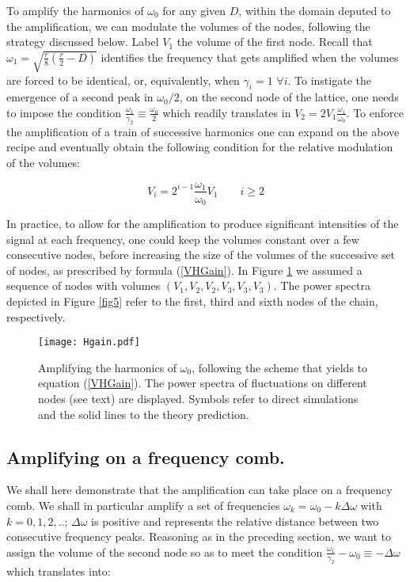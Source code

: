 \documentclass[showpacs,prl,superscriptaddress,nofootinbib, twocolumn]{revtex4}
\begin{document}
To amplify the harmonics of $\omega_0$ for any given $D$, within the domain deputed to the amplification, we can modulate the volumes of the nodes, following the strategy discussed below. Label $V_1$ the volume of the first node. Recall that $\omega_1=\sqrt{\frac{r}{8} \left(\frac{r}{2}-D\right)}$ identifies the frequency that gets amplified when the volumes are forced to be identical, or, equivalently, when $\gamma_i=1$ $\forall i$. To instigate the emergence of a second peak in $\omega_0/2$, on the second node of the lattice,  one needs to impose the condition $\frac{\omega_1}{\gamma_2} \equiv \frac{\omega_0}{2}$ which readily translates in $V_2=2V_1 \frac{\omega_1}{\omega_0}$. To enforce the amplification of a train of successive harmonics one can expand on the above recipe and eventually obtain the following condition for the relative modulation of the volumes:

\begin{equation}
\label{VHGain}
V_i = 2^{i-1} \frac{\omega_1}{\omega_0}V_1 \qquad i \ge 2
\end{equation}

In practice, to allow for the amplification to produce significant intensities of the signal at each frequency, one could keep the volumes constant over a few consecutive nodes, before increasing the size of the volumes of the successive set of nodes, as prescribed by formula (\ref{VHGain}). In Figure  \ref{fig4} we assumed a sequence of nodes with volumes $(V_1, V_2, V_2, V_3, V_3, V_3)$. The power spectra depicted in Figure  \ref{fig5}  refer to the first, third and sixth nodes of the chain, respectively.
   

\begin{figure}
 \centering
   {\texttt{[image: Hgain.pdf]}}
   \caption{Amplifying the harmonics of $\omega_0$, following the scheme that yields to equation (\ref{VHGain}). The power spectra of fluctuations on different nodes (see text) are displayed. Symbols refer to direct simulations and the solid lines to the theory prediction. 
}
\label{fig4}
\end{figure}

\subsection{Amplifying on a frequency comb.}

We shall here demonstrate that the amplification can take place on a frequency comb. We shall in particular amplify a set of frequencies 
$\omega_k=\omega_0- k \Delta \omega$ with $k=0,1,2,..$; $\Delta \omega$ is positive and represents the relative distance between two consecutive frequency peaks. Reasoning as in the preceding section, we want to assign the volume of the second node so as to meet the condition $\frac{\omega_1}{\gamma_2} -\omega_0 \equiv - \Delta \omega$ which translates into:
\end{document}
